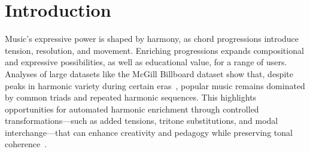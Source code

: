 \documentclass[conference]{IEEEtran}
\begin{document}
\section{Introduction}
\label{sec:introduction}
Music’s expressive power is shaped by harmony, as chord progressions introduce tension, resolution, and movement. Enriching progressions expands compositional and expressive possibilities, as well as educational value, for a range of users. Analyses of large datasets like the McGill Billboard dataset show that, despite peaks in harmonic variety during certain eras~\cite{burgoyne2011}, popular music remains dominated by common triads and repeated harmonic sequences. This highlights opportunities for automated harmonic enrichment through controlled transformations—such as added tensions, tritone substitutions, and modal interchange—that can enhance creativity and pedagogy while preserving tonal coherence~\cite{cecchetti2022hearing}.
\end{document}
